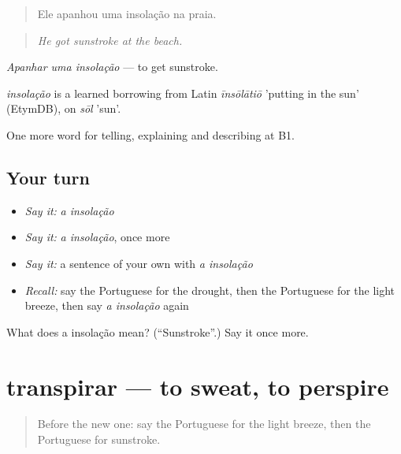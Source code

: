 \begin{quote}
Ele apanhou uma insolação na praia.
\end{quote}

\begin{quote}
\emph{He got sunstroke at the beach.}
\end{quote}

\emph{Apanhar uma insolação} — to get sunstroke.

\begin{cousinweb}
\emph{insolação} is a learned borrowing from Latin \emph{īnsōlātiō} 'putting in the sun' (EtymDB), on \emph{sōl} 'sun'.
\end{cousinweb}

\begin{grammarlens}[title={What you've built}]
One more word for telling, explaining and describing at B1.
\end{grammarlens}

\subsection*{Your turn}
\begin{itemize}
\raggedright
  \item \emph{Say it:} \emph{a insolação}
  \item \emph{Say it:} \emph{a insolação}, once more
  \item \emph{Say it:} a sentence of your own with \emph{a insolação}
  \item \emph{Recall:} say the Portuguese for the drought, then the Portuguese for the light breeze, then say \emph{a insolação} again
\end{itemize}

\begin{tcolorbox}[breakable,colback=teal!4,colframe=teal!35!black,title={Before you move on}]
What does a insolação mean? (\textquotedblleft{}Sunstroke\textquotedblright{}.) Say it once more.
\end{tcolorbox}
\section[transpirar]{transpirar — to sweat, to perspire}

\label{lesson:PT-C462-transpirar}



\begin{quote}
Before the new one: say the Portuguese for the light breeze, then the Portuguese for sunstroke.
\end{quote}

